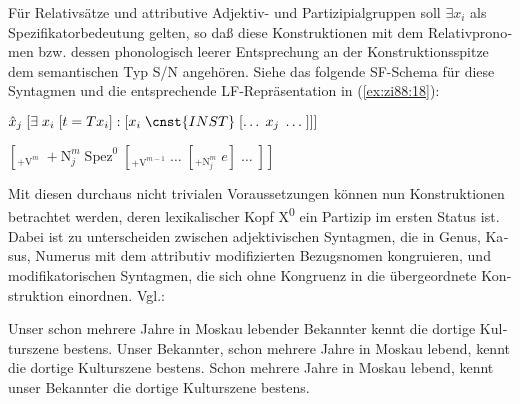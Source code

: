 \documentclass[output=paper,colorlinks,citecolor=brown, booklanguage=german]{langscibook}
\begin{document}
\begin{otherlanguage}{german}
Für Relativsätze und attributive Adjektiv- und Partizipialgruppen soll $\exists x_i$ als Spezifikatorbedeutung gelten, so daß diese Konstruktionen mit dem Relativpronomen bzw. dessen phonologisch leerer Entsprechung an der Konstruktionsspitze dem semantischen Typ S/N angehören. Siehe das folgende SF-Schema für diese Syntagmen und die entsprechende LF-Repräsentation in (\ref{ex:zi88:18}):

\ea\label{ex:zi88:17} $\hat{x}_j \; [\exists \; x_i \; [t=Tx_i] : [x_i \; \cnst{INST} \; [\dots \; x_j \; \dots \; ]]]$
\z 

\ea\label{ex:zi88:18} $[_{+\textrm{V}^m} \; + \textrm{N}_{j}^{m} \; \textrm{Spez}^0 \; [_{+\textrm{V}^{m-1}} \; \dots \; [_{+\textrm{N}_{j}^{m}} \; e] \; \dots \; ]]$
\z 

\noindent Mit diesen durchaus nicht trivialen Voraussetzungen können nun Konstruktionen betrachtet werden, deren lexikalischer Kopf X\textsuperscript{0} ein Partizip im ersten Status ist. Dabei ist zu unterscheiden zwischen adjektivischen Syntagmen, die in Genus, Kasus, Numerus mit dem attributiv modifizierten Bezugsnomen kongruieren, und modifikatorischen Syntagmen, die sich ohne Kongruenz in die übergeordnete Konstruktion einordnen. Vgl.:

\ea\label{ex:zi88:19}
    \ea\label{ex:zi88:19a} Unser schon mehrere Jahre in Moskau lebender Bekannter kennt die dortige Kulturszene bestens.
    \ex\label{ex:zi88:19b} Unser Bekannter, schon mehrere Jahre in Moskau lebend, kennt die dortige Kulturszene bestens.
    \ex\label{ex:zi88:19c} Schon mehrere Jahre in Moskau lebend, kennt unser Bekannter die dortige Kulturszene bestens.
\z\z 


\end{otherlanguage}
\end{document}
